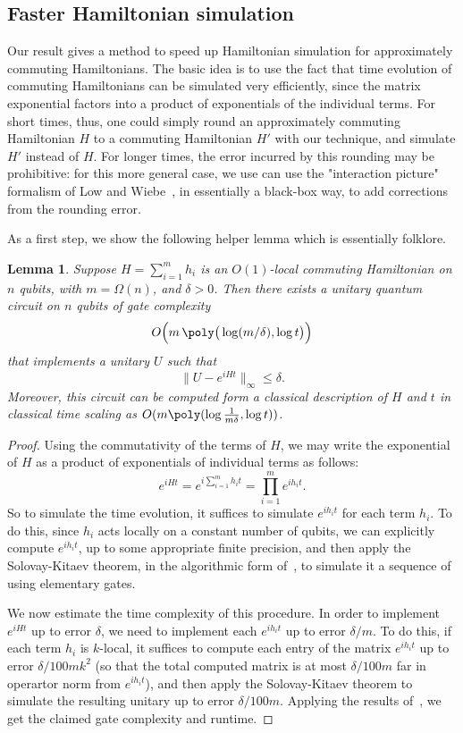\documentclass[a4paper,onecolumn,11pt]{quantumarticle}
\theoremstyle{plain}
\newtheorem{lemma}[theorem]{Lemma}
\begin{document}
\subsection{Faster Hamiltonian simulation}\label{sec:hamiltonian-simulation}
Our result gives a method to speed up Hamiltonian simulation for approximately commuting Hamiltonians. The basic idea is to use the fact that time evolution of commuting Hamiltonians can be simulated very efficiently, since the matrix exponential factors into a product of exponentials of the individual terms. For short times, thus, one could simply round an approximately commuting Hamiltonian $H$ to a commuting Hamiltonian $H'$ with our technique, and simulate $H'$ instead of $H$. For longer times, the error incurred by this rounding may be prohibitive: for this more general case, we use can use the "interaction picture" formalism of Low and Wiebe~\cite{low2018hamiltonian}, in essentially a black-box way, to add corrections from the rounding error. 

As a first step, we show the following helper lemma which is essentially folklore.
\begin{lemma}\label{lem:com-ham-fast}
    Suppose $H = \sum_{i=1}^{m} h_i$ is an $O(1)$-local commuting Hamiltonian on $n$ qubits, with $m = \Omega(n)$, and $\delta > 0$. Then there exists a unitary quantum circuit on $n$ qubits of gate complexity 
     \[ O\Big(m \, \poly\big(\log(m/\delta), \log t\big)\Big)\]
     that implements a unitary $U$ such that
     \[ \|U - e^{iHt} \|_\infty \leq \delta. \] 
     Moreover, this circuit can be computed form a classical description of $H$ and $t$ in classical time scaling as $O(m \poly(\log\frac{1}{m\delta}, \log t))$.
\end{lemma}
\begin{proof}
   Using the commutativity of the terms of $H$, we may write the exponential of $H$ as a product of exponentials of individual terms as follows:
    \[ e^{iHt} = e^{i\sum_{i=1}^{m} h_i t} = \prod_{i=1}^{m} e^{i h_i t}. \]
    So to simulate the time evolution, it suffices to simulate $e^{i h_i t}$ for each term $h_i$.
    To do this, since $h_i$ acts locally on a constant number of qubits, we can explicitly compute $e^{ih_i t}$, up to some appropriate finite precision, and then apply the Solovay-Kitaev theorem, in the algorithmic form of~\cite{dawson2006solovay}, to simulate it a sequence of using elementary gates.
    
    We now estimate the time complexity of this procedure. In order to implement $e^{iHt}$ up to error $\delta$, we need to implement each $e^{i h_i t}$ up to error $\delta/m$. To do this, if each term $h_i$ is $k$-local, it suffices to compute each entry of the matrix $e^{i h_i t}$ up to error $\delta/100mk^2$ (so that the total computed matrix is at most $\delta/100m$ far in operartor norm from $e^{ih_i t}$), and then apply the Solovay-Kitaev theorem to simulate the resulting unitary up to error $\delta/100m$. Applying the results of~\cite{dawson2006solovay}, we get the claimed gate complexity and runtime.
\end{proof}
\end{document}
